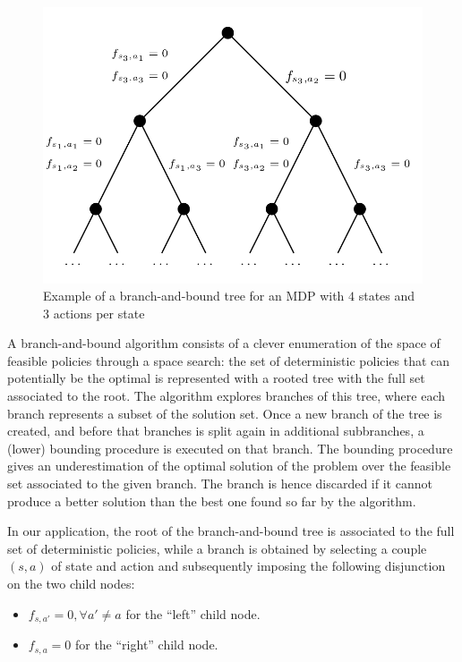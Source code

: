 \documentclass[runningheads,a4paper]{llncs}
\begin{document}
\begin{figure}
	\begin{center}
    \includegraphics[scale=0.25]{images/bb.png}
	\end{center}
	\caption{Example of a branch-and-bound tree for an MDP with $4$ states and $3$ actions per state}
	\label{fig:pic_bb}
\end{figure}

A branch-and-bound algorithm consists of a clever enumeration of the space of feasible policies through a space search: the set of deterministic policies that can potentially be the optimal is represented with a rooted tree with the full set associated to the root. The algorithm explores branches of this tree, where each branch represents a subset of the solution set.
Once a new branch of the tree is created, and before that branches is split again in additional subbranches, a (lower) bounding procedure is executed on that branch. The bounding procedure gives an underestimation of the optimal solution of the problem over the feasible set associated to the given branch.
The branch is hence discarded if it cannot produce a better solution than the best one found so far by the algorithm.

In our application, the root of the branch-and-bound tree is associated to the full set of deterministic policies, while a branch is obtained by selecting a couple $(s,a)$ of state and action and subsequently imposing the following disjunction on the two child nodes:
\begin{itemize}
\item $f_{s,a'}=0, \forall a'\neq a$ for the ``left'' child node.
\item $f_{s,a}=0$ for the ``right'' child node. 
\end{itemize} 
\end{document}
